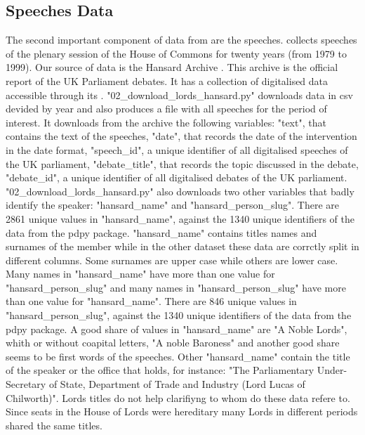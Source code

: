 \subsection{Speeches Data}
The second important component of data from \textcite{blumenauHouseCommonsParliamentary2021} are the speeches. \textcite{blumenauHouseCommonsParliamentary2021} collects speeches of the plenary session of the House of Commons for twenty years (from 1979 to 1999). Our source of data is the Hansard Archive \textcite{HansardUKParliament}. This archive is the official report of the UK Parliament debates. It has a collection of digitalised data accessible through its \textcite{HANSARD18032005}. "02\_download\_lords\_hansard.py" downloads data in csv devided by year and also produces a file with all speeches for the period of interest. It downloads from the archive the following variables: "text", that contains the text of the speeches, "date", that records the date of the intervention in the date format, "speech\_id", a unique identifier of all digitalised speeches of the UK parliament, "debate\_title", that records the topic discussed in the debate, "debate\_id", a unique identifier of all digitalised debates of the UK parliament. "02\_download\_lords\_hansard.py" also downloads two other variables that badly identify the speaker:
"hansard\_name" and "hansard\_person\_slug". There are 2861 unique values in "hansard\_name", against the 1340 unique identifiers of the data from the pdpy package.%
"hansard\_name" contains titles names and surnames of the member while in the other dataset these data are corrctly split in different columns. Some surnames are upper case while others are lower case. Many names in "hansard\_name" have more than one value for "hansard\_person\_slug" and many names in "hansard\_person\_slug" have more than one value for "hansard\_name". There are 846 unique values in "hansard\_person\_slug", against the 1340 unique identifiers of the data from the pdpy package.%
A good share of values in "hansard\_name" are "A Noble Lords", whith or without coapital letters, "A noble Baroness" and another good share seems to be first words of the speeches.%
Other "hansard\_name" contain the title of the speaker or the office that holds, for instance: "The Parliamentary Under-Secretary of State, Department of Trade and Industry (Lord Lucas of Chilworth)". Lords titles do not help clarifiyng to whom do these data refere to. Since seats in the House of Lords were hereditary \cite{HouseLordsAct} many Lords in different periods shared the same titles.
